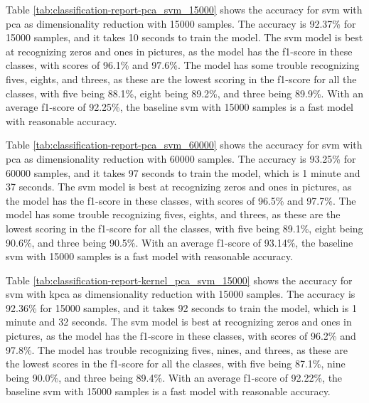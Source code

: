 
Table \ref{tab:classification-report-pca_svm_15000} shows the accuracy for \gls{svm} with \gls{pca} as dimensionality reduction with 15000 samples. The accuracy is 92.37\% for 15000 samples, and it takes 10 seconds to train the model. The \gls{svm} model is best at recognizing zeros and ones in pictures, as the model has the f1-score in these classes, with scores of 96.1\% and 97.6\%. The model has some trouble recognizing fives, eights, and threes, as these are the lowest scoring in the f1-score for all the classes, with five being 88.1\%, eight being 89.2\%, and three being 89.9\%. With an average f1-score of 92.25\%, the baseline \gls{svm} with 15000 samples is a fast model with reasonable accuracy.

Table \ref{tab:classification-report-pca_svm_60000} shows the accuracy for \gls{svm} with \gls{pca} as dimensionality reduction with 60000 samples. The accuracy is 93.25\% for 60000 samples, and it takes 97 seconds to train the model, which is 1 minute and 37 seconds. The \gls{svm} model is best at recognizing zeros and ones in pictures, as the model has the f1-score in these classes, with scores of 96.5\% and 97.7\%. The model has some trouble recognizing fives, eights, and threes, as these are the lowest scoring in the f1-score for all the classes, with five being 89.1\%, eight being 90.6\%, and three being 90.5\%. With an average f1-score of 93.14\%, the baseline \gls{svm} with 15000 samples is a fast model with reasonable accuracy.


Table \ref{tab:classification-report-kernel_pca_svm_15000} shows the accuracy for \gls{svm} with \gls{kpca} as dimensionality reduction with 15000 samples. The accuracy is 92.36\% for 15000 samples, and it takes 92 seconds to train the model, which is 1 minute and 32 seconds. The \gls{svm} model is best at recognizing zeros and ones in pictures, as the model has the f1-score in these classes, with scores of 96.2\% and 97.8\%. The model has trouble recognizing fives, nines, and threes, as these are the lowest scores in the f1-score for all the classes, with five being 87.1\%, nine being 90.0\%, and three being 89.4\%. With an average f1-score of 92.22\%, the baseline \gls{svm} with 15000 samples is a fast model with reasonable accuracy.

